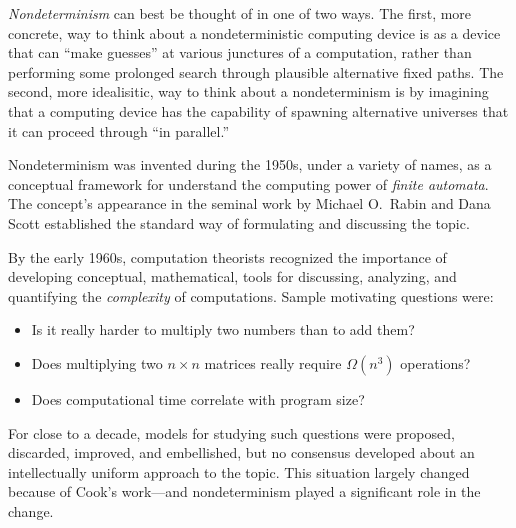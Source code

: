 \medskip

{\it Nondeterminism} can best be thought of in one of two ways.  The
first, more concrete, way to think about a nondeterministic computing
device is as a device that can ``make guesses'' at various junctures
of a computation, rather than performing some prolonged search through
plausible alternative fixed paths.  The second, more idealisitic, way
to think about a nondeterminism is by imagining that a computing
device has the capability of spawning alternative universes that it
can proceed through ``in parallel.''

\bigskip

\noindent {}
\bigskip

\noindent 
Nondeterminism was invented during the 1950s, under a variety of
names, as a conceptual framework for understand the computing power of
{\it finite automata}.   The concept's
appearance in the seminal work \cite{RabinS59} by Michael O.~Rabin
 and Dana Scott 
established the standard way of formulating and discussing the topic.

\medskip

By the early 1960s, computation theorists recognized the importance of
developing conceptual, mathematical, tools for discussing, analyzing,
and quantifying the {\it complexity} of computations.  Sample
motivating questions were:
\begin{itemize}
\item
Is it really harder to multiply two numbers than to add them?
\item
Does multiplying two $n \times n$ matrices really require
$\Omega(n^3)$ operations?
\item
Does computational time correlate with program size?
\end{itemize}
For close to a decade, models for studying such questions were
proposed, discarded, improved, and embellished, but no consensus
developed about an intellectually uniform approach to the topic.  This
situation largely changed because of Cook's work---and nondeterminism
played a significant role in the change.

